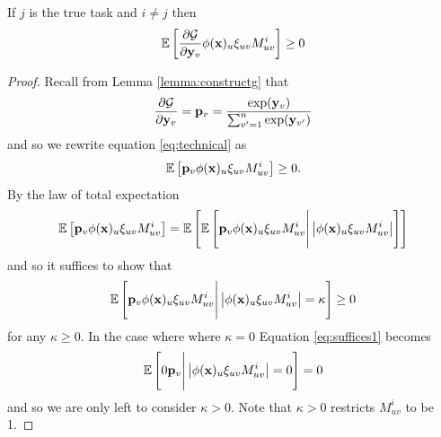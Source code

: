 \documentclass{article}
\begin{document}
\begin{lemma} \label{lem:tech}
If $j$ is the true task and $i \neq j$ then
\begin{align} \label{eq:technical}
    \mathbb{E}\left\lbrack \frac{\partial \mathcal{G}}{\partial \mathbf{y}_v} \phi(\mathbf{x})_u   \xi_{uv} M_{uv}^i \right\rbrack \geq 0
\end{align}
\begin{proof}
Recall from Lemma \ref{lemma:constructg} that 
\begin{align}
    \frac{\partial \mathcal{G}}{\partial \mathbf{y}_v} = \mathbf{p}_v = \frac{\exp(\mathbf{y}_v)}{\sum_{v' = 1}^n \exp(\mathbf{y}_{v'}) }
\end{align}
and so we rewrite equation \ref{eq:technical} as
\begin{align}
    \mathbb{E}\left\lbrack \mathbf{p}_v \phi(\mathbf{x})_u   \xi_{uv} M_{uv}^i \right\rbrack \geq 0.
\end{align}
By the law of total expectation
\begin{align}
   \mathbb{E}\left\lbrack \mathbf{p}_v \phi(\mathbf{x})_u   \xi_{uv} M_{uv}^i \right\rbrack =  \mathbb{E}\left\lbrack  \mathbb{E}\left\lbrack \mathbf{p}_v \phi(\mathbf{x})_u   \xi_{uv} M_{uv}^i \Bigg| \left| \phi(\mathbf{x})_u   \xi_{uv} M_{uv}^i \right|  \right\rbrack  \right\rbrack
\end{align}
and so it suffices to show that
\begin{align} \label{eq:suffices1}
    \mathbb{E}\left\lbrack \mathbf{p}_v \phi(\mathbf{x})_u   \xi_{uv} M_{uv}^i \Bigg| \left| \phi(\mathbf{x})_u   \xi_{uv} M_{uv}^i \right| = \kappa  \right\rbrack \geq 0
\end{align}
for any $\kappa \geq 0$. In the case where where $\kappa = 0$ Equation \ref{eq:suffices1} becomes
\begin{align} \label{eq:suffices2}
    \mathbb{E}\left\lbrack  0 \mathbf{p}_v \Bigg| \left| \phi(\mathbf{x})_u   \xi_{uv} M_{uv}^i \right| = 0  \right\rbrack = 0
\end{align}
and so we are only left to consider $\kappa > 0$. Note that $\kappa > 0$ restricts $M_{uv}^i$ to be 1.


\end{proof}
\end{lemma}
\end{document}
